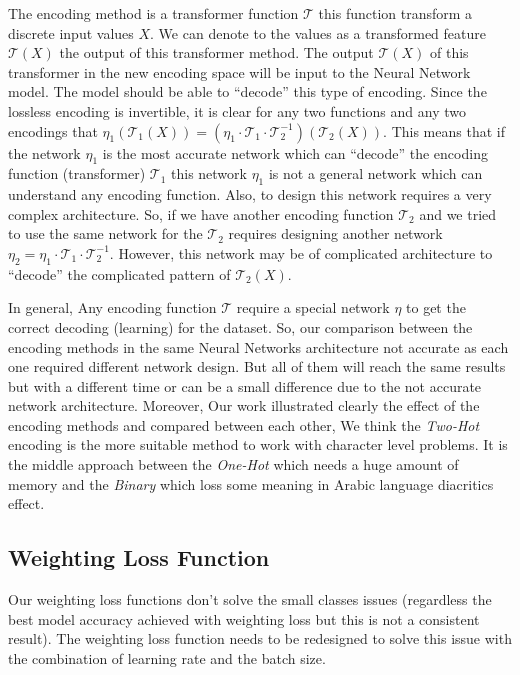 The encoding method is a transformer function $\mathcal{T}$ this function transform a discrete input values $X$. We can denote to the values as a transformed feature $\mathcal{T}(X)$ the output of this transformer method. The output $\mathcal{T}(X)$ of this transformer in the new encoding space will be input to the Neural Network model. The model should be able to ``decode''  this type of encoding. Since the lossless encoding is invertible, it is clear for any two functions and any two encodings that $\eta_1\left(\mathcal{T}_1(X)\right) = \left(\eta_1\cdot\mathcal{T}_1\cdot \mathcal{T}_2^{-1} \right)\left(\mathcal{T}_2(X)\right)$. This means that if the network $\eta_1$ is the most accurate network which can ``decode'' the encoding function (transformer) $\mathcal{T}_1$ this network $\eta_1$ is not a general network which can understand any encoding function. Also, to design this network requires a very complex architecture. So, if we have another encoding function $\mathcal{T}_2$ and we tried to use the same network for the $\mathcal{T}_2$ requires designing another network $\eta_2 = \eta_1\cdot\mathcal{T}_1\cdot \mathcal{T}_2^{-1}$. However, this network may be of complicated architecture to ``decode'' the complicated pattern of $\mathcal{T}_2(X)$.

In general, Any encoding function $\mathcal{T}$ require a special network $\eta$ to get the correct decoding (learning) for the dataset. So, our comparison between the encoding methods in the same Neural Networks architecture not accurate as each one required different network design. But all of them will reach the same results but with a different time or can be a small difference due to the not accurate network architecture. Moreover, Our work illustrated clearly the effect of the encoding methods and compared between each other, We think the \textit{Two-Hot} encoding is the more suitable method to work with character level problems. It is the middle approach between the \textit{One-Hot} which needs a huge amount of memory and the \textit{Binary} which loss some meaning in Arabic language diacritics effect.


\subsection{Weighting Loss Function}
Our weighting loss functions don’t solve the small classes issues (regardless the best model accuracy achieved with weighting loss but this is not a consistent result). The weighting loss function needs to be redesigned to solve this issue with the combination of learning rate and the batch size.

